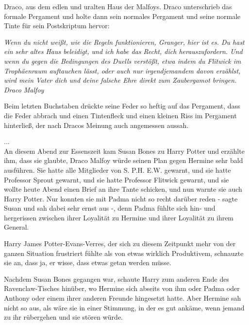 {Draco, aus dem edlen und uralten Haus der Malfoys. Draco unterschrieb das formale Pergament und holte dann sein normales Pergament und seine normale Tinte für sein Postskriptum hervor:

\emph{Wenn du nicht weißt, wie die Regeln funktionieren, Granger, hier ist es. Du hast ein sehr altes Haus beleidigt, und ich habe das Recht, dich herauszufordern. Und wenn du gegen die Bedingungen des Duells verstößt, etwa indem du Flitwick im Trophäenraum auftauchen lässt, oder auch nur irgendjemandem davon erzählst, wird mein Vater dich und deine falsche Ehre direkt zum Zaubergamot bringen.}\\ \emph{Draco Malfoy}

Beim letzten Buchstaben drückte seine Feder so heftig auf das Pergament, dass die Feder abbrach und einen Tintenfleck und einen kleinen Riss im Pergament hinterließ, der nach Dracos Meinung auch angemessen aussah.

...\\ An diesem Abend zur Essenszeit kam Susan Bones zu Harry Potter und erzählte ihm, dass sie glaubte, Draco Malfoy würde seinen Plan gegen Hermine sehr bald ausführen. Sie hatte alle Mitglieder von S. P.H. E.W. gewarnt, und sie hatte Professor Sprout gewarnt, und sie hatte Professor Flitwick gewarnt, und sie wollte heute Abend einen Brief an ihre Tante schicken, und nun warnte sie auch Harry Potter. Nur konnten sie mit Padma nicht so recht darüber reden - sagte Susan und sah dabei sehr ernst aus -, denn Padma fühlte sich hin- und hergerissen zwischen ihrer Loyalität zu Hermine und ihrer Loyalität zu ihrem General.

Harry James Potter-Evans-Verres, der sich zu diesem Zeitpunkt mehr von der ganzen Situation frustriert fühlte als von etwas wirklich Produktivem, schnauzte sie an, dass ja, er wisse, dass etwas getan werden müsse.

Nachdem Susan Bones gegangen war, schaute Harry zum anderen Ende des Ravenclaw-Tisches hinüber, wo Hermine sich abseits von ihm oder Padma oder Anthony oder einem ihrer anderen Freunde hingesetzt hatte. Aber Hermine sah nicht so aus, als wäre sie in einer Stimmung, in der es gut ankäme, wenn jemand zu ihr rübergehen und sie stören würde.

}
